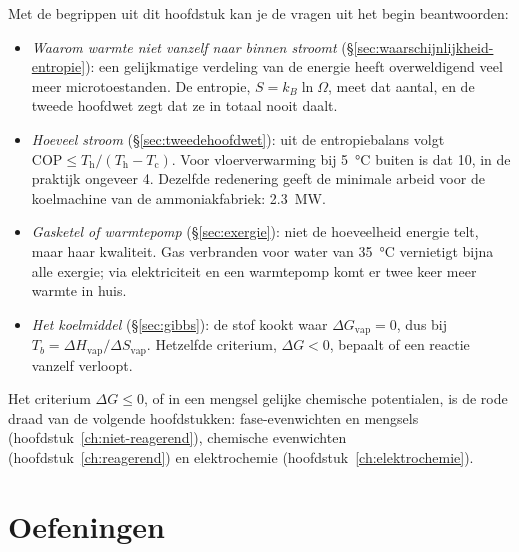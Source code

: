 Met de begrippen uit dit hoofdstuk kan je de vragen uit het begin beantwoorden:
\begin{itemize}
\item \emph{Waarom warmte niet vanzelf naar binnen stroomt} (\S\ref{sec:waarschijnlijkheid-entropie}): een gelijkmatige verdeling van de energie heeft overweldigend veel meer microtoestanden. De entropie, $S = k_B\ln\Omega$, meet dat aantal, en de tweede hoofdwet zegt dat ze in totaal nooit daalt.
\item \emph{Hoeveel stroom} (\S\ref{sec:tweedehoofdwet}): uit de entropiebalans volgt $\mathrm{COP} \leq T_\mathrm{h}/(T_\mathrm{h} - T_\mathrm{c})$. Voor vloerverwarming bij \SI{5}{\celsius} buiten is dat 10, in de praktijk ongeveer 4. Dezelfde redenering geeft de minimale arbeid voor de koelmachine van de ammoniakfabriek: \SI{2.3}{\mega\watt}.
\item \emph{Gasketel of warmtepomp} (\S\ref{sec:exergie}): niet de hoeveelheid energie telt, maar haar kwaliteit. Gas verbranden voor water van \SI{35}{\celsius} vernietigt bijna alle exergie; via elektriciteit en een warmtepomp komt er twee keer meer warmte in huis.
\item \emph{Het koelmiddel} (\S\ref{sec:gibbs}): de stof kookt waar $\Delta G_\text{vap} = 0$, dus bij $T_b = \Delta H_\text{vap}/\Delta S_\text{vap}$. Hetzelfde criterium, $\Delta G < 0$, bepaalt of een reactie vanzelf verloopt.
\end{itemize}
Het criterium $\Delta G \leq 0$, of in een mengsel gelijke chemische potentialen, is de rode draad van de volgende hoofdstukken: fase-evenwichten en mengsels (hoofdstuk~\ref{ch:niet-reagerend}), chemische evenwichten (hoofdstuk~\ref{ch:reagerend}) en elektrochemie (hoofdstuk~\ref{ch:elektrochemie}).

\newpage
\section{Oefeningen}


